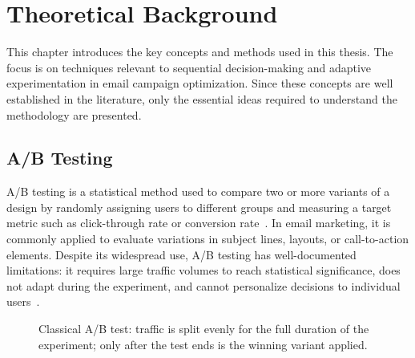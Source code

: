 \chapter{Theoretical Background}
\label{chap:background}

This chapter introduces the key concepts and methods used in this thesis. The focus is on techniques relevant to sequential decision-making and adaptive experimentation in email campaign optimization. Since these concepts are well established in the literature, only the essential ideas required to understand the methodology are presented.

\section{A/B Testing}

A/B testing is a statistical method used to compare two or more variants of a design by randomly assigning users to different groups and measuring a target metric such as click-through rate or conversion rate~\cite{kohavi2009controlled}. In email marketing, it is commonly applied to evaluate variations in subject lines, layouts, or call-to-action elements. Despite its widespread use, A/B testing has well-documented limitations: it requires large traffic volumes to reach statistical significance, does not adapt during the experiment, and cannot personalize decisions to individual users~\cite{deng2013improving}.

\begin{figure}[htbp]
    \centering
    \caption{Classical A/B test: traffic is split evenly for the full duration of the
    experiment; only after the test ends is the winning variant applied.}
    \label{fig:ab_split}
\end{figure}

